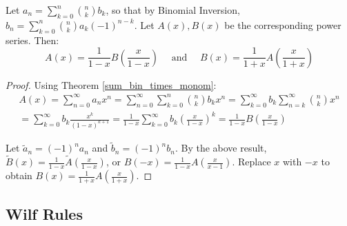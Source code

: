 \documentclass[a4paper]{article}
\begin{document}

\begin{theorem}
Let $a_n=\sum_{k=0}^n\binom nkb_k$, so that by Binomial Inversion, $b_n=\sum_{k=0}^n\binom nka_k(-1)^{n-k}$. Let $A(x),B(x)$ be the corresponding power series. Then:
\begin{equation*}
A(x)=\frac1{1-x}B\left(\frac x{1-x}\right)\quad\text{ and }\quad B(x)=\frac1{1+x}A\left(\frac x{1+x}\right)
\end{equation*}

\begin{hl}
\begin{proof}
Using Theorem \ref{sum_bin_times_monom}:
\begin{multline*}
A(x)
=\sum_{n=0}^\infty a_nx^n
=\sum_{n=0}^\infty\sum_{k=0}^n\binom nkb_kx^n
=\sum_{k=0}^\infty b_k\sum_{n=k}^\infty\binom nkx^n\\
=\sum_{k=0}^\infty b_k\frac{x^k}{(1-x)^{k+1}}
=\frac1{1-x}\sum_{k=0}^\infty b_k\left(\frac{x}{1-x}\right)^k
=\frac1{1-x}B\left(\frac{x}{1-x}\right)
\end{multline*}

Let $\widetilde a_n=(-1)^na_n$ and $\widetilde b_n=(-1)^nb_n$. By the above result, $\widetilde B(x)=\frac1{1-x}\widetilde A\left(\frac x{1-x}\right)$, or $B(-x)=\frac1{1-x}A\left(\frac x{x-1}\right)$. Replace $x$ with $-x$ to obtain $B(x)=\frac1{1+x}A\left(\frac{x}{1+x}\right)$.
\end{proof}
\end{hl}
\end{theorem}

\subsection{Wilf Rules}
\end{document}
